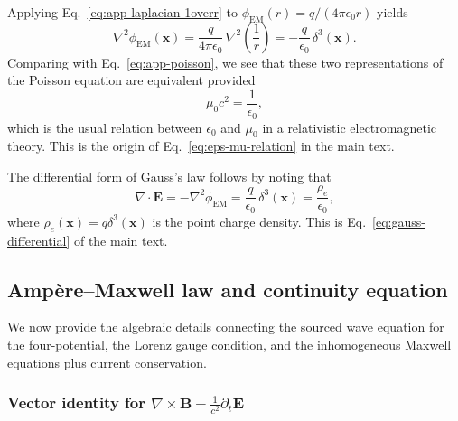 \documentclass[11pt]{article}
\begin{document}
Applying Eq.~\eqref{eq:app-laplacian-1overr} to $\phi_{\mathrm{EM}}(r) = q/(4\pi\epsilon_0 r)$ yields
\begin{equation}
\nabla^2 \phi_{\mathrm{EM}}(\mathbf{x})
= \frac{q}{4\pi\epsilon_0}\,\nabla^2\left(\frac{1}{r}\right)
= -\frac{q}{\epsilon_0}\,\delta^3(\mathbf{x}).
\end{equation}
Comparing with Eq.~\eqref{eq:app-poisson}, we see that these two representations of the Poisson equation are equivalent provided
\begin{equation}
\mu_0 c^2 = \frac{1}{\epsilon_0},
\end{equation}
which is the usual relation between $\epsilon_0$ and $\mu_0$ in a relativistic electromagnetic theory.  This is the origin of Eq.~\eqref{eq:eps-mu-relation} in the main text.

The differential form of Gauss's law follows by noting that
\begin{equation}
\nabla\cdot\mathbf{E}
= -\nabla^2 \phi_{\mathrm{EM}}
= \frac{q}{\epsilon_0}\,\delta^3(\mathbf{x})
= \frac{\rho_e}{\epsilon_0},
\end{equation}
where $\rho_e(\mathbf{x}) = q \delta^3(\mathbf{x})$ is the point charge density.  This is Eq.~\eqref{eq:gauss-differential} of the main text.

\subsection{Amp\`ere--Maxwell law and continuity equation}
\label{app:ampere-continuity-details}

We now provide the algebraic details connecting the sourced wave equation for the four-potential, the Lorenz gauge condition, and the inhomogeneous Maxwell equations plus current conservation.

\subsubsection{Vector identity for \texorpdfstring{$\nabla\times\mathbf{B} - \frac{1}{c^2}\partial_t\mathbf{E}$}{curl B - (1/c squared) dE/dt}}
\end{document}
